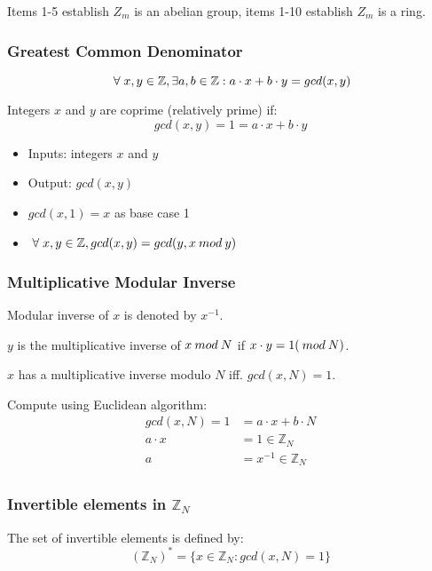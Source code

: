 \documentclass[a4paper]{article}
\begin{document}
Items 1-5 establish $Z_{m}$ is an abelian group, items 1-10 establish $Z_{m}$ is
a ring.

\subsubsection{Greatest Common Denominator}

\[\;\forall\; x, y \in \mathbb{Z}, \exists a, b \in \mathbb{Z} :
a \cdot x + b \cdot y = gcd(x, y)\]

Integers $x$ and $y$ are coprime (relatively prime) if:
\[gcd(x, y) = 1 = a \cdot x + b \cdot y\]


\begin{itemize}
  \item Inputs: integers $x$ and $y$
  \item Output: $gcd(x, y)$
  \item $gcd(x, 1) = x$ as base case 1
  \item $\;\forall\; x, y \in \mathbb{Z}, gcd(x, y) = gcd(y, x \: mod \: y)$
\end{itemize}

\subsubsection{Multiplicative Modular Inverse}

Modular inverse of $x$ is denoted by $x^{-1}$.

$y$ is the multiplicative inverse of $x \: mod \: N$ if $x \cdot y = 1 (\: mod \: N)$.

$x$ has a multiplicative inverse modulo $N$ iff. $gcd(x, N) = 1$.

Compute using Euclidean algorithm:
\begin{align*}
  gcd(x, N) = 1 &= a \cdot x + b \cdot N \\
  a \cdot x &= 1 \in \mathbb{Z}_{N} \\
  a &= x^{-1} \in \mathbb{Z}_{N} \\
\end{align*}

\subsubsection{Invertible elements in $\mathbb{Z}_{N}$}

The set of invertible elements is defined by:
\[(\mathbb{Z}_{N})^{*} = \{x \in \mathbb{Z}_{N} : gcd(x, N) = 1\}\]
\end{document}
